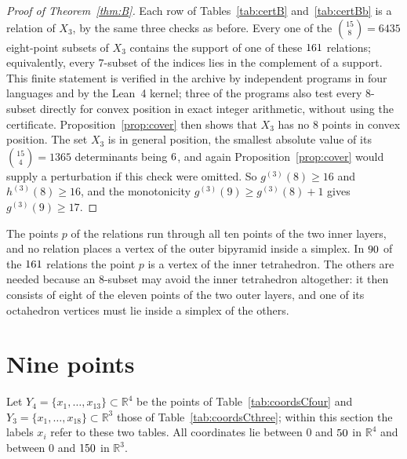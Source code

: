 \documentclass[aps,prd,twocolumn,superscriptaddress,nofootinbib,longbibliography,floatfix,showkeys,amsmath,amssymb,10pt]{revtex4-2}
\theoremstyle{plain}
\theoremstyle{definition}
\theoremstyle{plain}
\newcommand{\R}{\mathbb{R}}
\begin{document}
\begin{proof}[Proof of Theorem~\ref{thm:B}]
Each row of Tables~\ref{tab:certB} and~\ref{tab:certBb} is a relation of $X_3$, by the same three checks as before. Every one of the $\binom{15}{8}=6435$ eight-point subsets of $X_3$ contains the support of one of these $161$ relations; equivalently, every $7$-subset of the indices lies in the complement of a support. This finite statement is verified in the archive \cite{BB26z} by independent programs in four languages and by the Lean~4 kernel; three of the programs also test every $8$-subset directly for convex position in exact integer arithmetic, without using the certificate. Proposition~\ref{prop:cover} then shows that $X_3$ has no $8$ points in convex position. The set $X_3$ is in general position, the smallest absolute value of its $\binom{15}{4}=1365$ determinants being $6$, and again Proposition~\ref{prop:cover} would supply a perturbation if this check were omitted. So $g^{(3)}(8)\ge16$ and $h^{(3)}(8)\ge16$, and the monotonicity $g^{(3)}(9)\ge g^{(3)}(8)+1$ gives $g^{(3)}(9)\ge17$.
\end{proof}

The points $p$ of the relations run through all ten points of the two inner layers, and no relation places a vertex of the outer bipyramid inside a simplex. In $90$ of the $161$ relations the point $p$ is a vertex of the inner tetrahedron. The others are needed because an $8$-subset may avoid the inner tetrahedron altogether: it then consists of eight of the eleven points of the two outer layers, and one of its octahedron vertices must lie inside a simplex of the others.

\section{Nine points}\label{sec:C}

Let $Y_4=\{x_1,\dots,x_{13}\}\subset\R^4$ be the points of Table~\ref{tab:coordsCfour} and $Y_3=\{x_1,\dots,x_{18}\}\subset\R^3$ those of Table~\ref{tab:coordsCthree}; within this section the labels $x_i$ refer to these two tables. All coordinates lie between $0$ and $50$ in $\R^4$ and between $0$ and $150$ in $\R^3$.



\end{document}
